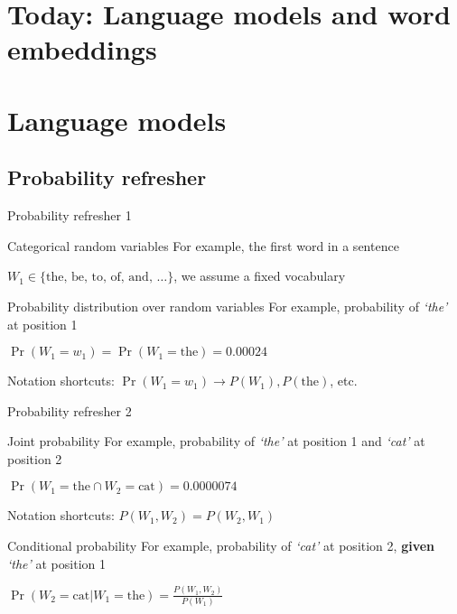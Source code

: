 \documentclass[12pt,aspectratio=169,handout]{beamer}
\begin{document}
\section*{Today: Language models and word embeddings}

\section{Language models}

\subsection{Probability refresher}


\begin{frame}{Probability refresher 1}
	
	\begin{block}{Categorical random variables}
		For example, the first word in a sentence
		
		$W_1 \in \{ \textrm{the, be, to, of, and, } \ldots \}$, we assume a fixed vocabulary
	\end{block}
	
	\pause
	
	\begin{block}{Probability distribution over random variables}
		For example, probability of \emph{`the'} at position 1
		
		$\Pr(W_1 = w_1) = \Pr(W_1 = \text{the}) = 0.00024$
		
		\pause
		
		Notation shortcuts: $\Pr(W_1 = w_1) \to P(W_1), P(\text{the})$, etc.
	\end{block}
	
\end{frame}


\begin{frame}{Probability refresher 2}
	
	
	\begin{block}{Joint probability}
		For example, probability of \emph{`the'} at position 1 and \emph{`cat'} at position 2
		
		$\Pr(W_1 = \text{the} \cap W_2 = \text{cat}) = 0.0000074$
		
		\pause
		
		Notation shortcuts: $P(W_1, W_2) = P(W_2, W_1)$
	\end{block}
	
	\pause
	
	\begin{block}{Conditional probability}
		For example, probability of \emph{`cat'} at position 2, \textbf{given} \emph{`the'} at position 1
		
		$\Pr(W_2 = \text{cat} | W_1 = \text{the} ) = \frac{P(W_1, W_2)}{P(W_1)}$
	\end{block}
	
\end{frame}
\end{document}
